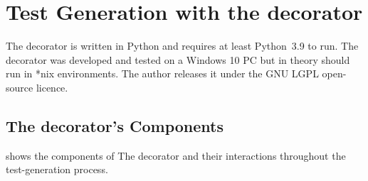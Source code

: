 \section{Test Generation with the decorator}\label{sec:approach}

The decorator is written in Python and requires at least Python~3.9 to run.
%
The decorator was developed and tested on a Windows 10 PC but in theory
should run in *nix environments.
%
The author releases it under the GNU LGPL open-source licence.
%


\subsection{The decorator's Components}\label{sec:approach-internal}

 shows the components of The decorator 
and their interactions
throughout the test-generation process.
%









